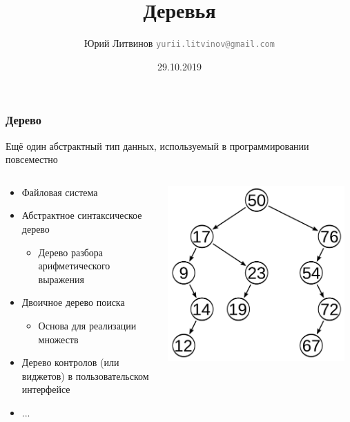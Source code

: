 \documentclass[xetex,mathserif,serif]{beamer}
\title{Деревья}
\author[Юрий Литвинов]{Юрий Литвинов \newline \textcolor{gray}{\small\texttt{yurii.litvinov@gmail.com}}}
\date{29.10.2019}
\begin{document}
	
	\frame{\titlepage}
	
	\begin{frame}
		\frametitle{Дерево}
		Ещё один абстрактный тип данных, используемый в программировании повсеместно
		\begin{columns}
			\begin{column}{0.55\textwidth}
				\begin{itemize}
					\item Файловая система
					\item Абстрактное синтаксическое дерево
					\begin{itemize}
						\item Дерево разбора арифметического выражения
					\end{itemize}
					\item Двоичное дерево поиска
					\begin{itemize}
						\item Основа для реализации множеств
					\end{itemize}
					\item Дерево контролов (или виджетов) в пользовательском интерфейсе
					\item ...
				\end{itemize}
			\end{column}
			\begin{column}{0.45\textwidth}
				\begin{center}
					\includegraphics[width=0.95\textwidth]{tree.png}
				\end{center}
			\end{column}
		\end{columns}
	\end{frame}
\end{document}
